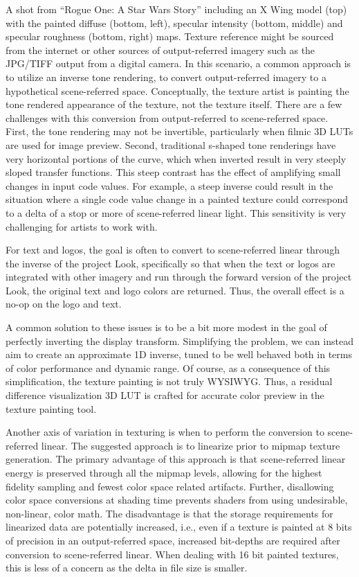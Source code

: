 A shot from “Rogue One: A Star Wars Story” including an X Wing model (top) with the painted diffuse (bottom, left), specular intensity (bottom, middle) and specular roughness (bottom, right) maps.
Texture reference might be sourced from the internet or other sources of output-referred imagery such as the JPG/TIFF output from a digital camera. In this scenario, a common approach is to utilize an inverse tone rendering, to convert output-referred imagery to a hypothetical scene-referred space. Conceptually, the texture artist is painting the tone rendered appearance of the texture, not the texture itself. There are a few challenges with this conversion from output-referred to scene-referred space. First, the tone rendering may not be invertible, particularly when filmic 3D LUTs are used for image preview. Second, traditional s-shaped tone renderings have very horizontal portions of the curve, which when inverted result in very steeply sloped transfer functions. This steep contrast has the effect of amplifying small changes in input code values. For example, a steep inverse could result in the situation where a single code value change in a painted texture could correspond to a delta of a stop or more of scene-referred linear light. This sensitivity is very challenging for artists to work with.

For text and logos, the goal is often to convert to scene-referred linear through the inverse of the project Look, specifically so that when the text or logos are integrated with other imagery and run through the forward version of the project Look, the original text and logo colors are returned. Thus, the overall effect is a no-op on the logo and text.

A common solution to these issues is to be a bit more modest in the goal of perfectly inverting the display transform. Simplifying the problem, we can instead aim to create an approximate 1D inverse, tuned to be well behaved both in terms of color performance and dynamic range. Of course, as a consequence of this simplification, the texture painting is not truly WYSIWYG. Thus, a residual difference visualization 3D LUT is crafted for accurate color preview in the texture painting tool.

Another axis of variation in texturing is when to perform the conversion to scene-referred linear. The suggested approach is to linearize prior to mipmap texture generation. The primary advantage of this approach is that scene-referred linear energy is preserved through all the mipmap levels, allowing for the highest fidelity sampling and fewest color space related artifacts. Further, disallowing color space conversions at shading time prevents shaders from using undesirable, non-linear, color math. The disadvantage is that the storage requirements for linearized data are potentially increased, i.e., even if a texture is painted at 8 bits of precision in an output-referred space, increased bit-depths are required after conversion to scene-referred linear. When dealing with 16 bit painted textures, this is less of a concern as the delta in file size is smaller.

